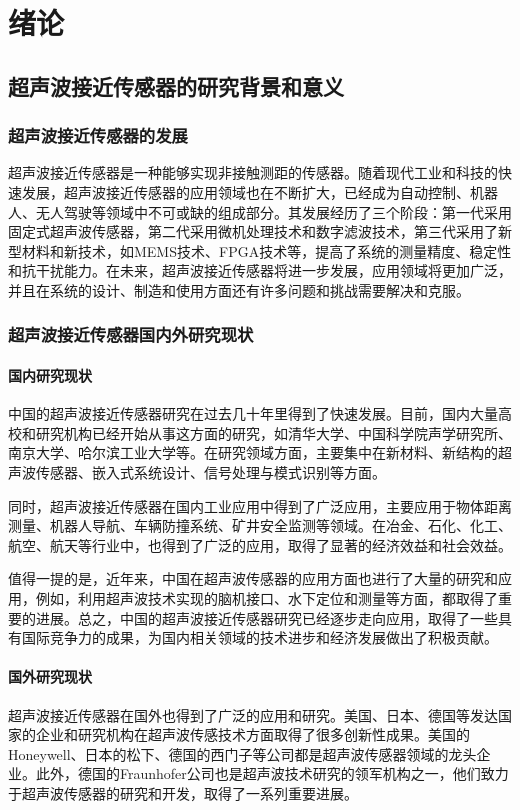 	\newpage
	\section{绪论}
    \subsection{超声波接近传感器的研究背景和意义}
    \subsubsection{超声波接近传感器的发展}
    超声波接近传感器是一种能够实现非接触测距的传感器。随着现代工业和科技的快速发展，超声波接近传感器的应用领域也在不断扩大，已经成为自动控制、机器人、无人驾驶等领域中不可或缺的组成部分。其发展经历了三个阶段：第一代采用固定式超声波传感器，第二代采用微机处理技术和数字滤波技术，第三代采用了新型材料和新技术，如MEMS技术、FPGA技术等，提高了系统的测量精度、稳定性和抗干扰能力。在未来，超声波接近传感器将进一步发展，应用领域将更加广泛，并且在系统的设计、制造和使用方面还有许多问题和挑战需要解决和克服。
    \subsubsection{超声波接近传感器国内外研究现状}
    \paragraph{国内研究现状}
    中国的超声波接近传感器研究在过去几十年里得到了快速发展。目前，国内大量高校和研究机构已经开始从事这方面的研究，如清华大学、中国科学院声学研究所、南京大学、哈尔滨工业大学等。在研究领域方面，主要集中在新材料、新结构的超声波传感器、嵌入式系统设计、信号处理与模式识别等方面。
    
    同时，超声波接近传感器在国内工业应用中得到了广泛应用，主要应用于物体距离测量、机器人导航、车辆防撞系统、矿井安全监测等领域。在冶金、石化、化工、航空、航天等行业中，也得到了广泛的应用，取得了显著的经济效益和社会效益。
    
    值得一提的是，近年来，中国在超声波传感器的应用方面也进行了大量的研究和应用，例如，利用超声波技术实现的脑机接口、水下定位和测量等方面，都取得了重要的进展。总之，中国的超声波接近传感器研究已经逐步走向应用，取得了一些具有国际竞争力的成果，为国内相关领域的技术进步和经济发展做出了积极贡献。
    \paragraph{国外研究现状}
    超声波接近传感器在国外也得到了广泛的应用和研究。美国、日本、德国等发达国家的企业和研究机构在超声波传感技术方面取得了很多创新性成果。美国的Honeywell、日本的松下、德国的西门子等公司都是超声波传感器领域的龙头企业。此外，德国的Fraunhofer公司也是超声波技术研究的领军机构之一，他们致力于超声波传感器的研究和开发，取得了一系列重要进展。
    
